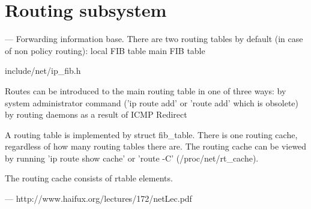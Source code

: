 
\chapter{Routing subsystem}
---
Forwarding information base.
There are two routing tables by default (in case of non policy routing):
local FIB table
main FIB table

include/net/ip_fib.h


Routes can be introduced to the main routing table in one of three ways:
by system administrator command ('ip route add' or 'route add' which is obsolete)
by routing daemons
as a result of ICMP Redirect

A routing table is implemented by struct fib_table.
There is one routing cache, regardless of how many routing tables there are.
The routing cache can be viewed by running 'ip route show cache' or 'route -C' (/proc/net/rt_cache).

The routing cache consists of rtable elements.


---
http://www.haifux.org/lectures/172/netLec.pdf
